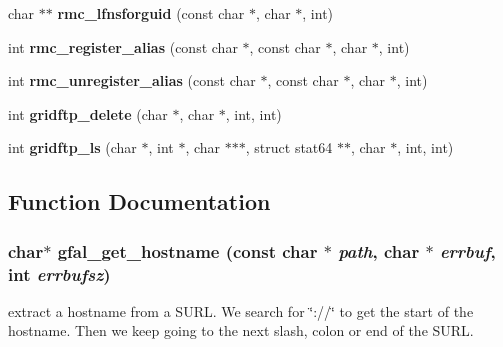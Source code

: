 \begin{CompactItemize}
\item 
char $\ast$$\ast$ \textbf{rmc\_\-lfnsforguid} (const char $\ast$, char $\ast$, int)\label{group__internal__group_g7311bb7aa4f897ebf7f91bbb55c81d5b}

\item 
int \textbf{rmc\_\-register\_\-alias} (const char $\ast$, const char $\ast$, char $\ast$, int)\label{group__internal__group_g726824240cad440eb7a60259b9468a40}

\item 
int \textbf{rmc\_\-unregister\_\-alias} (const char $\ast$, const char $\ast$, char $\ast$, int)\label{group__internal__group_g3da248a6139d1cab4b4432793b2df115}

\item 
int \textbf{gridftp\_\-delete} (char $\ast$, char $\ast$, int, int)\label{group__internal__group_g227bf30b43a3fb3ba58d280c4669d558}

\item 
int \textbf{gridftp\_\-ls} (char $\ast$, int $\ast$, char $\ast$$\ast$$\ast$, struct stat64 $\ast$$\ast$, char $\ast$, int, int)\label{group__internal__group_g4c8a3503515b82f59509d89a4a858c9f}

\end{CompactItemize}


\subsection{Function Documentation}
\subsubsection{\setlength{\rightskip}{0pt plus 5cm}char$\ast$ gfal\_\-get\_\-hostname (const char $\ast$ {\em path}, char $\ast$ {\em errbuf}, int {\em errbufsz})}\label{group__internal__group_gfbe1d2da151f9bd6a0ab1ec1abf0ac81}


extract a hostname from a SURL. We search for \char`\"{}://\char`\"{} to get the start of the hostname. Then we keep going to the next slash, colon or end of the SURL. 